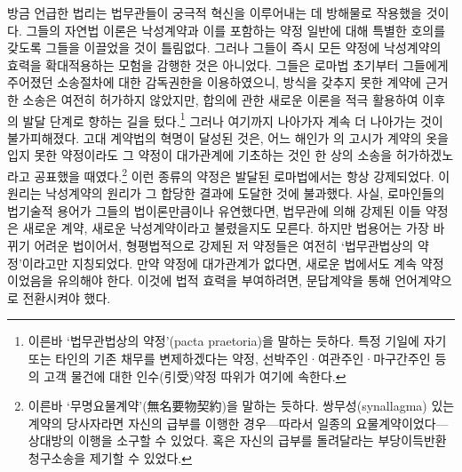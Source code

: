 방금 언급한 법리는 법무관들이 궁극적 혁신을 이루어내는 데
방해물로 작용했을 것이다.
그들의 자연법 이론은
낙성계약과 이를 포함하는 약정 일반에 대해
특별한 호의를 갖도록 그들을 이끌었을 것이 틀림없다.
그러나 그들이 즉시
모든 약정에 낙성계약의 효력을 확대적용하는 모험을 감행한 것은 아니었다.
그들은 로마법 초기부터 그들에게 주어졌던
소송절차에 대한 감독권한을 이용하였으니,
방식을 갖추지 못한 계약에 근거한 소송은 여전히 허가하지 않았지만,
합의에 관한 새로운 이론을 적극 활용하여
이후의 발달 단계로 향하는 길을 텄다.\footnote{%
  이른바 `법무관법상의 약정'(pacta praetoria)을 말하는 듯하다.
  특정 기일에 자기 또는 타인의 기존 채무를 변제하겠다는 약정,
  선박주인^^b7여관주인^^b7마구간주인 등의 고객 물건에 대한 인수(引受)약정
  따위가 여기에 속한다.
  }
그러나
여기까지 나아가자
계속 더 나아가는 것이 불가피해졌다.
고대 계약법의 혁명이 달성된 것은,
어느 해인가 의 고시가
계약의 옷을 입지 못한 약정이라도
그 약정이 대가관계에
기초하는 것인 한
상의 소송을 허가하겠노라고 공표했을 때였다.\footnote{%
  이른바 `무명요물계약'(無名要物契約)을 말하는 듯하다.
  쌍무성(synallagma) 있는 계약의 당사자라면
  자신의 급부를 이행한 경우---따라서 일종의 요물계약이었다---상대방의
  이행을 소구할 수 있었다.
  혹은 자신의 급부를 돌려달라는 부당이득반환청구소송을 제기할 수 있었다.
  }
이런 종류의 약정은 발달된 로마법에서는 항상 강제되었다.
이 원리는
낙성계약의 원리가 그 합당한 결과에 도달한 것에 불과했다.
사실, 로마인들의 법기술적 용어가 그들의 법이론만큼이나 유연했다면,
법무관에 의해 강제된 이들 약정은
새로운 계약, 새로운 낙성계약이라고 불렸을지도 모른다.
하지만 법용어는 가장 바뀌기 어려운 법이어서,
형평법적으로 강제된 저 약정들은
여전히 `법무관법상의 약정'이라고만 지칭되었다.
만약 약정에 대가관계가 없다면,
새로운 법에서도 계속 약정이었음을
유의해야 한다.
이것에 법적 효력을 부여하려면,
문답계약을 통해 언어계약으로 전환시켜야 했다.

